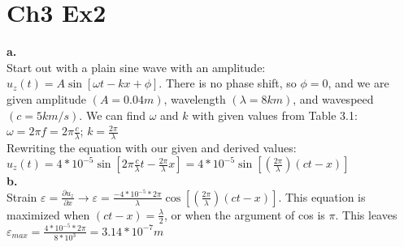 \documentclass{article}
\begin{document}
\section{Ch3 Ex2}
\textbf{a.}\\
Start out with a plain sine wave with an amplitude: $u_z\left(t\right) = A \sin\left[ \omega t - k x + \phi   \right]$. There is no phase shift, so $\phi = 0$, and we are given amplitude $\left(A = 0.04m\right)$, wavelength $\left(\lambda = 8km\right)$, and wavespeed $\left(c = 5 km/s\right)$. We can find $\omega$ and $k$ with given values from Table 3.1: $\omega = 2\pi f = 2\pi \frac{c}{\lambda}$; $k = \frac{2\pi}{\lambda}$ \\

Rewriting the equation with our given and derived values: \\

$u_z\left(t\right) = 4*10^{-5} \sin\left[2\pi \frac{c}{\lambda} t - \frac{2\pi}{\lambda}x\right] = 4*10^{-5}  \sin\left[\left(\frac{2\pi}{\lambda}\right)\left(ct-x\right)\right]$ \\

\textbf{b.}\\
Strain $\varepsilon = \frac{\partial{u_z}}{\partial{x}} \rightarrow
\varepsilon = \frac{-4*10^{-5} *2\pi}{\lambda} \cos\left[\left(\frac{2\pi}{\lambda}\right)(ct-x)\right]$. This equation is maximized when $\left(ct-x\right) = \frac{\lambda}{2}$, or when the argument of cos is $\pi$. This leaves $\varepsilon_{max} = \frac{4*10^{-5} *2\pi}{8*10^{3}} = 3.14 * 10^{-7}m$ 
\end{document}

